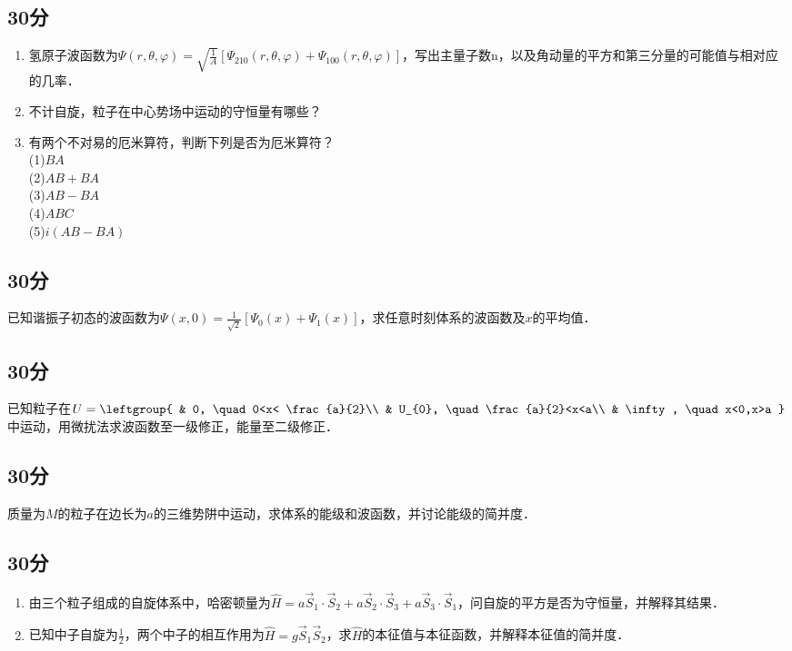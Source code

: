 
\subsection{30分}
\begin{enumerate}
\item 氢原子波函数为$\varPsi (r,\theta,\varphi)=\sqrt{\frac{1}{A}}[\varPsi_{210}(r,\theta,\varphi)+\varPsi_{100}(r,\theta,\varphi)]$，写出主量子数n，以及角动量的平方和第三分量的可能值与相对应的几率．
\item 不计自旋，粒子在中心势场中运动的守恒量有哪些？
\item 有两个不对易的厄米算符，判断下列是否为厄米算符？\\
(1)$BA$\\(2)$AB+BA$\\(3)$AB-BA$\\(4)$ABC$\\(5)$i(AB-BA)$
\end{enumerate}
\subsection{30分}
已知谐振子初态的波函数为$\varPsi(x,0)=\frac{1}{\sqrt{2}}[\varPsi_{0}(x)+\varPsi_{1}(x)]$，求任意时刻体系的波函数及$x$的平均值．
\subsection{30分}
已知粒子在$U=\leftgroup{
    & 0, \quad 0<x< \frac{a}{2}\\
    & U_{0}, \quad \frac{a}{2}<x<a\\
    & \infty, \quad x<0,x>a
}$中运动，用微扰法求波函数至一级修正，能量至二级修正．
\subsection{30分}
质量为$M$的粒子在边长为$a$的三维势阱中运动，求体系的能级和波函数，并讨论能级的简并度．
\subsection{30分}
\begin{enumerate}
\item 由三个粒子组成的自旋体系中，哈密顿量为$\hat {H}=a\vec{S}_1\cdot\vec{S}_2+a\vec{S}_2\cdot\vec{S}_3+a\vec{S}_3\cdot\vec{S}_1$，问自旋的平方是否为守恒量，并解释其结果．
\item 已知中子自旋为$\frac{1}{2}$，两个中子的相互作用为$\hat {H}=g\vec{S}_1\vec{S}_2$，求$\hat {H}$的本征值与本征函数，并解释本征值的简并度．
\end{enumerate}